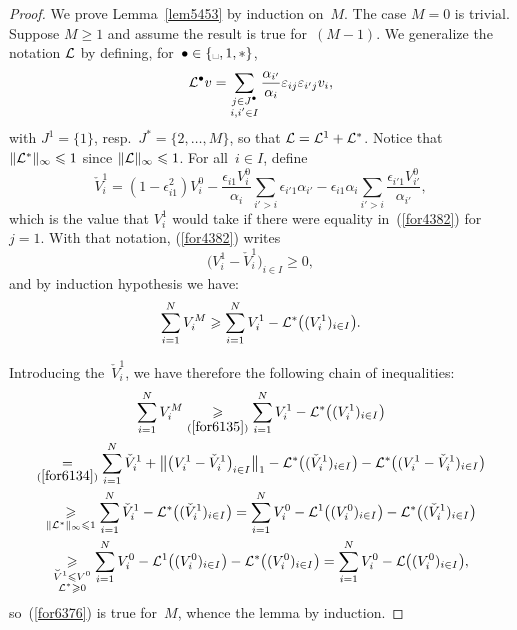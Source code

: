 \begingroup{}\begin{proof}
We prove Lemma~\ref{lem5453} by induction on~$M$.
The case $M=0$ is trivial.
Suppose $M\geq1$ and assume the result is true for~${(M-1)}$.
We generalize the notation $\mathcal{L}$
by defining, for~$\bullet \in \{\text{\textvisiblespace},1,*\}$,
\[ \mathcal{L}^{\bullet}v = \sum_{\substack{j\in J^{\bullet}\\i,i'\in I}}
\frac{\alpha_{i'}}{\alpha_i} \varepsilon_{ij}\varepsilon_{i'j} v_i ,\]
with $J^1 = \{1\}$, resp.\ $J^* = \{2,\ldots,M\}$,
so that $\mathcal{L} = \mathcal{L}^1 + \mathcal{L}^*$.
Notice that $\|\mathcal{L}^*\|_{\infty}\leqslant 1$ since ${\|\mathcal{L}\|_{\infty}\leqslant1}$.
For all~$i \in I$, define
\[ \check{V}^1_i = (1-\epsilon_{i1}^2) V^0_i - \frac{\epsilon_{i1} V^0_i}{\alpha_i} \sum_{i'>i} \epsilon_{i'1}\alpha_{i'}
- \epsilon_{i1}\alpha_i \sum_{i'>i} \frac{\epsilon_{i'1}V^0_{i'}}{\alpha_{i'}} ,\]
which is the value that $V^1_i$ would take if there were equality in~(\ref{for4382})
for $j=1$.
%
With that notation, (\ref{for4382}) writes
\[\label{for6134} \big( V^1_i - \check{V}^1_i \big)_{i\in I} \geq 0 ,\]
and by induction hypothesis we have:
\[\label{for6135} \sum_{i=1}^N V^M_i \geq \sum_{i=1}^N V^1_i - \mcal{L}^* \big( (V^1_i)_{i\in I} \big) .\]

Introducing the~$\check{V}^1_i$, we have therefore the following chain of inequalities:
\begin{multline}
\sum_{i=1}^N V^M_i \footrel{(\ref{for6135})}{\geq}
\sum_{i=1}^N V^1_i - \mcal{L}^* \big( (V^1_i)_{i\in I} \big) \\
%
\footrel{(\ref{for6134})}{=} \sum_{i=1}^N \check{V}^1_i + \big\| \big( V^1_i - \check{V}^1_i \big)_{i\in I} \big\|_1
- \mcal{L}^* \big( (\check{V}^1_i)_{i\in I} \big) - \mcal{L}^* \big( (V^1_i - \check{V}^1_i)_{i\in I} \big) \\
%
\footrel{\|\mcal{L}^*\|_\infty\leq1}{\geq} \sum_{i=1}^N \check{V}^1_i - \mcal{L}^* \big( (\check{V}^1_i)_{i\in I} \big)
%
= \sum_{i=1}^N V^0_i - \mcal{L}^1 \big( (V^0_i)_{i\in I} \big)
- \mcal{L}^* \big( (\check{V}^1_i)_{i\in I} \big) \\
%
\footrel{\substack{\check{V}^1\leq V^0\\\mcal{L}^*\geq0}}{\geq}
\sum_{i=1}^N V^0_i - \mcal{L}^1 \big( (V^0_i)_{i\in I} \big)
- \mcal{L}^* \big( (V^0_i)_{i\in I} \big)
%
= \sum_{i=1}^N V^0_i - \mcal{L} \big( (V^0_i)_{i\in I} \big),
\end{multline}
%
so~(\ref{for6376}) is true for~$M$, whence the lemma by induction.
\end{proof}\endgroup


